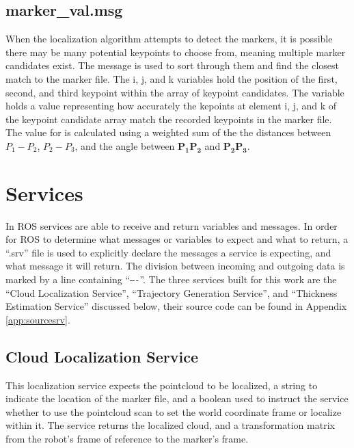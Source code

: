 \subsection{marker\_val.msg}
When the localization algorithm attempts to detect the markers, it is possible there may be many potential keypoints to choose from, meaning multiple marker candidates exist. The  message is used to sort through them and find the closest match to the marker file. The i, j, and k variables hold the position of the first, second, and third keypoint within the array of keypoint candidates. The  variable holds a value representing how accurately the kepoints at element i, j, and k of the keypoint candidate array match the recorded keypoints in the marker file. The value for  is calculated using a weighted sum of the the distances between $P_1-P_2$, $P_2-P_3$, and the angle between $\mathbf{P_1P_2}$ and $\mathbf{P_2P_3}$. \\

\section{Services}
In ROS services are able to receive and return variables and messages. In order for ROS to determine what messages or variables to expect and what to return, a ``.srv'' file is used to explicitly declare the messages a service is expecting, and what message it will return. The division between incoming and outgoing data is marked by a line containing ``\texttt{----}''. The three services built for this work are the ``Cloud Localization Service'', ``Trajectory Generation Service'', and ``Thickness Estimation Service'' discussed below, their source code can be found in Appendix \ref{app:sourcesrv}.\\
\subsection{Cloud Localization Service}
This localization service expects the pointcloud to be localized, a string to indicate the location of the marker file, and a boolean used to instruct the service whether to use the pointcloud scan to set the world coordinate frame or localize within it. The service returns the localized cloud, and a transformation matrix from the robot's frame of reference to the marker's frame.\\
%
  
